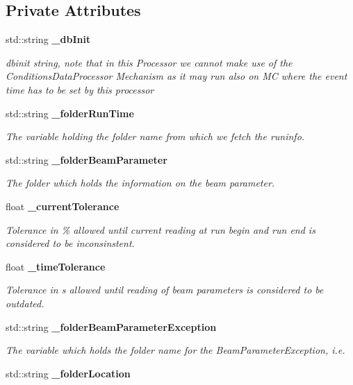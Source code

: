 \subsection*{Private Attributes}
\begin{DoxyCompactItemize}
\item 
std\-::string {\bf \-\_\-db\-Init}\label{classmarlin_1_1RunInfoProcessor_a65053a1bdf8789ad7285a32739a69807}

\begin{DoxyCompactList}\small\item\em dbinit string, note that in this Processor we cannot make use of the Conditions\-Data\-Processor Mechanism as it may run also on M\-C where the event time has to be set by this processor \end{DoxyCompactList}\item 
std\-::string {\bf \-\_\-folder\-Run\-Time}\label{classmarlin_1_1RunInfoProcessor_aeb0c70371d7b4e0cd37581188894103e}

\begin{DoxyCompactList}\small\item\em The variable holding the folder name from which we fetch the runinfo. \end{DoxyCompactList}\item 
std\-::string {\bf \-\_\-folder\-Beam\-Parameter}\label{classmarlin_1_1RunInfoProcessor_adbdb31a2fc1c90aa15700d0906a15b15}

\begin{DoxyCompactList}\small\item\em The folder which holds the information on the beam parameter. \end{DoxyCompactList}\item 
float {\bf \-\_\-current\-Tolerance}\label{classmarlin_1_1RunInfoProcessor_aab826ec0a4e9dde1f2b2d4e9a079ee22}

\begin{DoxyCompactList}\small\item\em Tolerance in \% allowed until current reading at run begin and run end is considered to be inconsinstent. \end{DoxyCompactList}\item 
float {\bf \-\_\-time\-Tolerance}\label{classmarlin_1_1RunInfoProcessor_abdd63cb1e6b5a847089182c30929ccb8}

\begin{DoxyCompactList}\small\item\em Tolerance in s allowed until reading of beam parameters is considered to be outdated. \end{DoxyCompactList}\item 
std\-::string {\bf \-\_\-folder\-Beam\-Parameter\-Exception}
\begin{DoxyCompactList}\small\item\em The variable which holds the folder name for the Beam\-Parameter\-Exception, i.\-e. \end{DoxyCompactList}\item 
std\-::string {\bf \-\_\-folder\-Location}\label{classmarlin_1_1RunInfoProcessor_a1570d9cda3d532a23820e09b9da4210d}


\end{DoxyCompactItemize}
